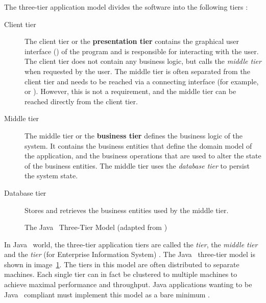 The three-tier application model divides the software into the 
following tiers \citep{patterns3tier}:

\begin{description}

\item [Client tier] The client tier or the \textbf{presentation tier} 
contains the graphical user interface () of the program 
and is responsible for interacting with the user. The client tier does 
not contain any business logic, but calls the \textsl{middle tier} 
when requested by the user. The middle tier is often separated from 
the client tier and needs to be reached via a connecting interface 
(for example,  or  
\citep{patterns3tier,parviainen}). However, this is not a requirement, 
and the middle tier can be reached directly from the client tier.

\item[Middle tier] The middle tier or the \textbf{business tier} 
defines the business logic of the system. It contains the business 
entities that define the domain model of the application, and the 
business operations that are used to alter the state of the business 
entities. The middle tier uses the \textsl{database tier} to persist 
the system state.
  
\item[Database tier] Stores and retrieves the business entities used 
by the middle tier.
\end{description}

\begin{figure}
\begin{center}
  \caption{The Java~ Three-Tier Model (adapted from
  \citep{j2eednd})}
  \label{fig:jee3tier}
\end{center}
\end{figure}

In Java~ world, the three-tier application tiers are called 
the \textsl{ tier}, the \textsl{middle tier} and the 
\textsl{ tier} (for Enterprise Information System) 
\citep{j2eednd}. The Java~ three-tier model is shown in 
image~\ref{fig:jee3tier}. The tiers in this model are often 
distributed to separate machines. Each single tier can in fact be 
clustered to multiple machines to achieve maximal performance and 
throughput. Java applications wanting to be Java~ compliant 
must implement this model as a bare minimum \citep{rapidspring}.


